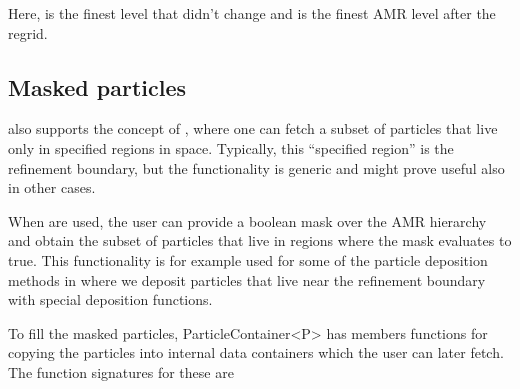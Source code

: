 \documentclass[letterpaper,10pt,english]{sphinxmanual}
\begin{document}
Here,  is the finest level that didn’t change and  is the finest AMR level after the regrid.


\subsection{Masked particles}
\label{\detokenize{Source/Particles:masked-particles}}\label{\detokenize{Source/Particles:chap-maskedparticles}}
 also supports the concept of , where one can fetch a subset of particles that live only in specified regions in space.
Typically, this “specified region” is the refinement boundary, but the functionality is generic and might prove useful also in other cases.

When  are used, the user can provide a boolean mask over the AMR hierarchy and obtain the subset of particles that live in regions where the mask evaluates to true.
This functionality is for example used for some of the particle deposition methods in  where we deposit particles that live near the refinement boundary with special deposition functions.

To fill the masked particles, {\color{red}\bfseries{}\textasciigrave{}\textasciigrave{}}ParticleContainer\textless{}P\textgreater{}\textasciigrave{} has members functions for copying the particles into internal data containers which the user can later fetch.
The function signatures for these are

\begin{sphinxVerbatim}[commandchars=\\\{\},formatcom=\scriptsize]
      

  
    

  
    
\end{sphinxVerbatim}
\end{document}
